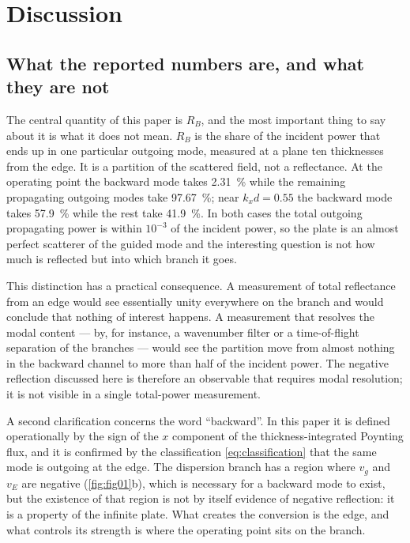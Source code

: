 \section{Discussion}
\label{sec:discussion}

\subsection{What the reported numbers are, and what they are not}
\label{sec:disc_meaning}

The central quantity of this paper is $R_B$, and the most important thing to say
about it is what it does not mean.  $R_B$ is the share of the incident power
that ends up in one particular outgoing mode, measured at a plane ten
thicknesses from the edge.  It is a partition of the scattered field, not a
reflectance.  At the operating point the backward mode takes
\SI{2.31}{\percent} while the remaining propagating outgoing modes take
\SI{97.67}{\percent}; near $k_xd=0.55$ the backward mode takes
\SI{57.9}{\percent} while the rest take \SI{41.9}{\percent}.  In both cases the
total outgoing propagating power is within $10^{-3}$ of the incident power, so
the plate is an almost perfect scatterer of the guided mode and the interesting
question is not how much is reflected but into which branch it goes.

This distinction has a practical consequence.  A measurement of total
reflectance from an edge would see essentially unity everywhere on the branch
and would conclude that nothing of interest happens.  A measurement that resolves
the modal content --- by, for instance, a wavenumber filter or a time-of-flight
separation of the branches --- would see the partition move from almost nothing
in the backward channel to more than half of the incident power.  The negative
reflection discussed here is therefore an observable that requires modal
resolution; it is not visible in a single total-power measurement.

A second clarification concerns the word ``backward''.  In this paper it is
defined operationally by the sign of the $x$ component of the thickness-integrated
Poynting flux, and it is confirmed by the classification \eqref{eq:classification}
that the same mode is outgoing at the edge.  The dispersion branch has a region
where $v_g$ and $v_E$ are negative (\cref{fig:fig01}b), which is necessary for a
backward mode to exist, but the existence of that region is not by itself
evidence of negative reflection: it is a property of the infinite plate.  What
creates the conversion is the edge, and what controls its strength is where the
operating point sits on the branch.

